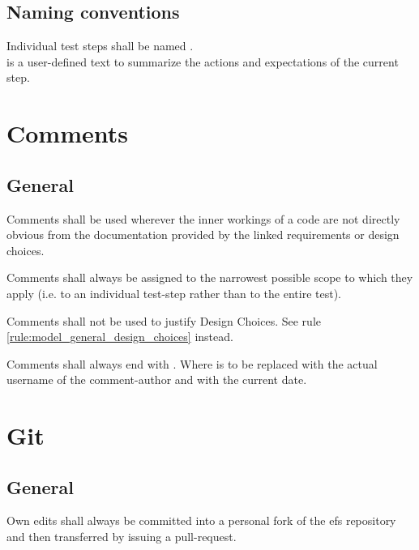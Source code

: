 \documentclass[draft]{efsguide}
\begin{document}
\section{Naming conventions}
\label{rules:tests_naming}
\begin{rules}
\item Individual test steps shall be named .\\  is a user-defined text to summarize the actions and expectations of the current step. 
\end{rules}


\chapter{Comments}

\section{General}
\begin{rules}
\item Comments shall be used wherever the inner workings of a code are not directly obvious from the documentation provided by the linked requirements or design choices. 
\item Comments shall always be assigned to the narrowest possible scope to which they apply (i.e. to an individual test-step rather than to the entire test). 
\item Comments shall not be used to justify Design Choices. See rule \ref{rule:model_general_design_choices} instead. 
\item Comments shall always end with . Where  is to be replaced with the actual username of the comment-author and  with the current date. 
\end{rules}


\chapter{Git}
\section{General}
\begin{rules}
\item \label{rule:pullrequest} Own edits shall always be committed into a personal fork of the \gls{efs} repository and then transferred by issuing a pull-request. 
\end{rules}
\end{document}
